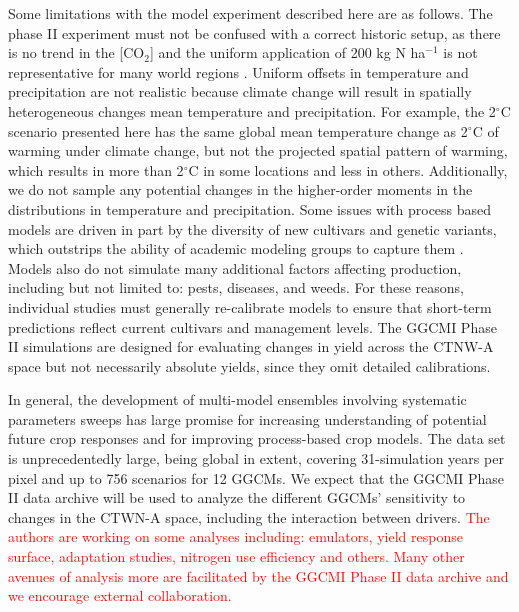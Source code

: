 \documentclass[gmd, manuscript]{copernicus} %
\begin{document}
Some limitations with the model experiment described here are as follows.
The phase II experiment must not be confused with a correct historic setup, as there is no trend in the [CO$_2$] and the uniform application of 200 kg N ha$^{-1}$ is not representative for many world regions \citep{Elliott2015}.
Uniform offsets in temperature and precipitation are not realistic because climate change will result in spatially heterogeneous changes mean temperature and precipitation. 
For example, the 2$^{\circ}$C scenario presented here has the same global mean temperature change as 2$^{\circ}$C of warming under climate change, but not the projected spatial pattern of warming, which results in more than 2$^{\circ}$C in some locations and less in others.
Additionally, we do not sample any potential changes in the higher-order moments in the distributions in temperature and precipitation. 
Some issues with process based models are driven in part by the diversity of new cultivars and genetic variants, which outstrips the ability of academic modeling groups to capture them \citep[e.g.][]{JONES2017b}. 
Models also do not simulate many additional factors affecting production, including but not limited to: pests, diseases, and weeds. 
For these reasons, individual studies must generally re-calibrate models to ensure that short-term predictions reflect current cultivars and management levels. 
The GGCMI Phase II simulations are designed for evaluating changes in yield across the CTNW-A space but not necessarily absolute yields, since they omit detailed calibrations. 



In general, the development of multi-model ensembles involving systematic parameters sweeps has large promise for increasing understanding of potential future crop responses and for improving process-based crop models.
The data set is unprecedentedly large, being global in extent, covering 31-simulation years per pixel and up to 756 scenarios for 12 GGCMs.
We expect that the GGCMI Phase II data archive will be used to analyze the different GGCMs' sensitivity to changes in the CTWN-A space, including the interaction between drivers.
\textcolor{red}{The authors are working on some analyses including: emulators, yield response surface, adaptation studies, nitrogen use efficiency and others.
Many other avenues of analysis more are facilitated by the GGCMI Phase II data archive and we encourage external collaboration.}
\end{document}
